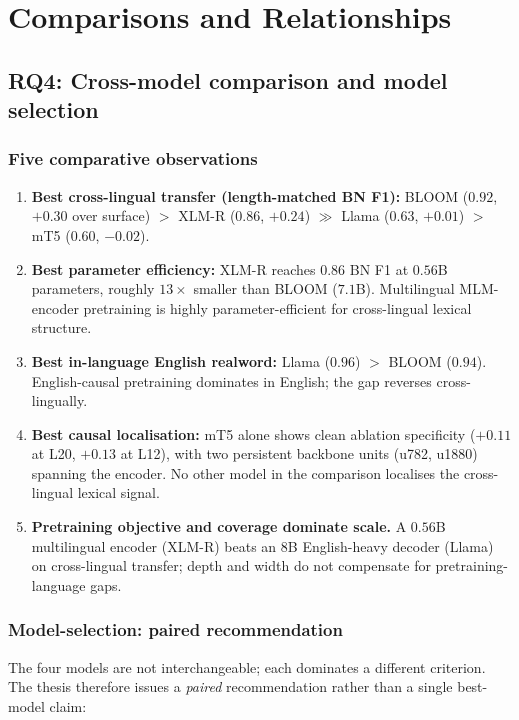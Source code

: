\section{Comparisons and Relationships}
\label{sec:comparisons}

\subsection{RQ4: Cross-model comparison and model selection}
\label{sec:rq4}

\subsubsection{Five comparative observations}

\begin{enumerate}
    \item \textbf{Best cross-lingual transfer (length-matched BN F1):} BLOOM ($0.92$, $+0.30$ over surface) $>$ XLM-R ($0.86$, $+0.24$) $\gg$ Llama ($0.63$, $+0.01$) $>$ mT5 ($0.60$, $-0.02$).
    \item \textbf{Best parameter efficiency:} XLM-R reaches $0.86$ BN F1 at $0.56$B parameters, roughly $13\times$ smaller than BLOOM ($7.1$B). Multilingual MLM-encoder pretraining is highly parameter-efficient for cross-lingual lexical structure.
    \item \textbf{Best in-language English realword:} Llama ($0.96$) $>$ BLOOM ($0.94$). English-causal pretraining dominates in English; the gap reverses cross-lingually.
    \item \textbf{Best causal localisation:} mT5 alone shows clean ablation specificity ($+0.11$ at L20, $+0.13$ at L12), with two persistent backbone units (u782, u1880) spanning the encoder. No other model in the comparison localises the cross-lingual lexical signal.
    \item \textbf{Pretraining objective and coverage dominate scale.} A $0.56$B multilingual encoder (XLM-R) beats an $8$B English-heavy decoder (Llama) on cross-lingual transfer; depth and width do not compensate for pretraining-language gaps.
\end{enumerate}

\subsubsection{Model-selection: paired recommendation}

The four models are not interchangeable; each dominates a different criterion. The thesis therefore issues a \emph{paired} recommendation rather than a single best-model claim:

